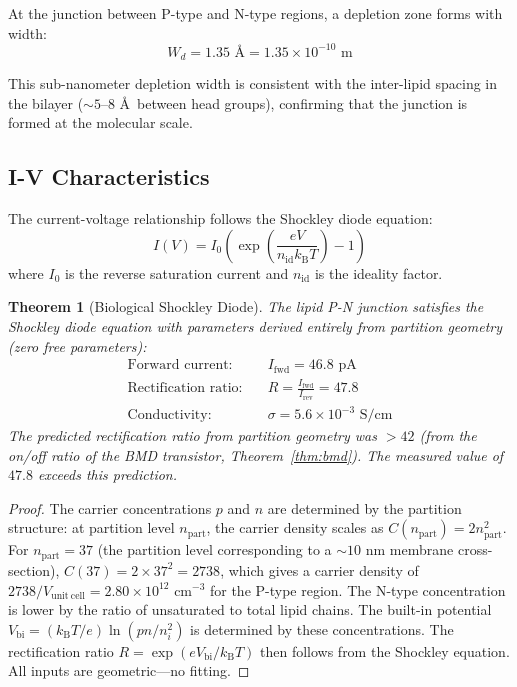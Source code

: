 \documentclass[12pt]{article}
\newtheorem{theorem}{Theorem}[section]
\theoremstyle{definition}
\theoremstyle{remark}
\newcommand{\kB}{k_{\mathrm{B}}}
\begin{document}
At the junction between P-type and N-type regions, a depletion zone forms with width:
\begin{equation}
\label{eq:depletion}
W_d = 1.35 \text{ \AA} = 1.35 \times 10^{-10} \text{ m}
\end{equation}

This sub-nanometer depletion width is consistent with the inter-lipid spacing in the bilayer ($\sim 5$--$8$ \AA\ between head groups), confirming that the junction is formed at the molecular scale.

\subsection{I-V Characteristics}

The current-voltage relationship follows the Shockley diode equation:
\begin{equation}
\label{eq:shockley}
I(V) = I_0 \left(\exp\left(\frac{eV}{n_{\mathrm{id}} \kB T}\right) - 1\right)
\end{equation}
where $I_0$ is the reverse saturation current and $n_{\mathrm{id}}$ is the ideality factor.

\begin{theorem}[Biological Shockley Diode]
\label{thm:shockley}
The lipid P-N junction satisfies the Shockley diode equation with parameters derived entirely from partition geometry (zero free parameters):
\begin{align}
\text{Forward current:} &\quad I_{\mathrm{fwd}} = 46.8 \text{ pA} \label{eq:forward_current} \\
\text{Rectification ratio:} &\quad R = \frac{I_{\mathrm{fwd}}}{I_{\mathrm{rev}}} = 47.8 \label{eq:rectification} \\
\text{Conductivity:} &\quad \sigma = 5.6 \times 10^{-3} \text{ S/cm} \label{eq:conductivity}
\end{align}
The predicted rectification ratio from partition geometry was $>42$ (from the on/off ratio of the BMD transistor, Theorem~\ref{thm:bmd}). The measured value of $47.8$ exceeds this prediction.
\end{theorem}

\begin{proof}
The carrier concentrations $p$ and $n$ are determined by the partition structure: at partition level $n_{\mathrm{part}}$, the carrier density scales as $C(n_{\mathrm{part}}) = 2n_{\mathrm{part}}^2$. For $n_{\mathrm{part}} = 37$ (the partition level corresponding to a $\sim 10$ nm membrane cross-section), $C(37) = 2 \times 37^2 = 2738$, which gives a carrier density of $2738/V_{\mathrm{unit~cell}} = 2.80 \times 10^{12}$ cm$^{-3}$ for the P-type region. The N-type concentration is lower by the ratio of unsaturated to total lipid chains. The built-in potential $V_{\mathrm{bi}} = (\kB T / e) \ln(pn/n_i^2)$ is determined by these concentrations. The rectification ratio $R = \exp(eV_{\mathrm{bi}}/\kB T)$ then follows from the Shockley equation. All inputs are geometric---no fitting. \qedhere
\end{proof}
\end{document}
